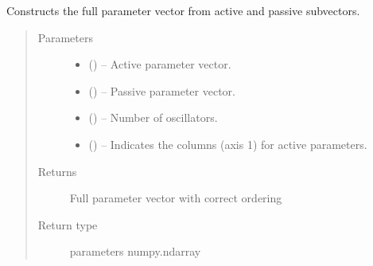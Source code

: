 \documentclass[letterpaper,10pt,english]{sphinxmanual}
\begin{document}
\begin{fulllineitems}
\label{\detokenize{references/nlp/_funcs:nmrespy.nlp._funcs._construct_parameters}}
\sphinxAtStartPar
Constructs the full parameter vector from active and passive sub\sphinxhyphen{}vectors.
\begin{quote}\begin{description}
\item[{Parameters}] \leavevmode\begin{itemize}
\item {} 
\sphinxAtStartPar
{} () – Active parameter vector.

\item {} 
\sphinxAtStartPar
{} () – Passive parameter vector.

\item {} 
\sphinxAtStartPar
{} () – Number of oscillators.

\item {} 
\sphinxAtStartPar
{} () – Indicates the columns (axis 1) for active parameters.

\end{itemize}

\item[{Returns}] \leavevmode
\sphinxAtStartPar
Full parameter vector with correct ordering

\item[{Return type}] \leavevmode
\sphinxAtStartPar
parameters \sphinxhyphen{} numpy.ndarray

\end{description}\end{quote}

\end{fulllineitems}

\end{document}
